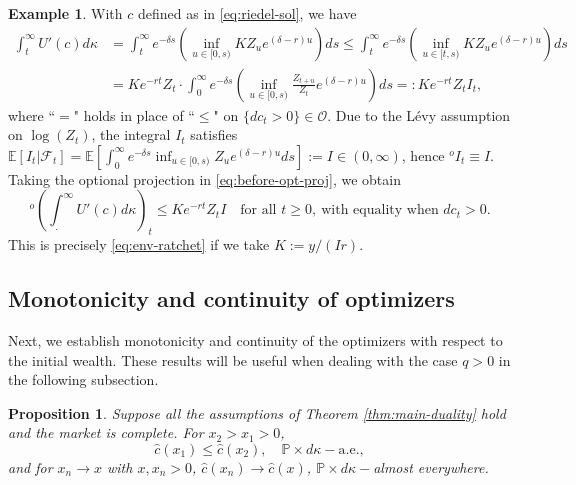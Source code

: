 \documentclass[11pt, oneside]{article}   	%
\theoremstyle{plain}
\newtheorem{prop}[thm]{Proposition}
\theoremstyle{definition}
\newtheorem{exmp}[thm]{Example}
\theoremstyle{remark}
\begin{document}
\begin{exmp}
With $c$ defined as in \eqref{eq:riedel-sol}, we have
\begin{equation}\label{eq:before-opt-proj}
\begin{aligned}
\int_t^\infty U'(c)d\kappa&=\int_t^\infty e^{-\delta s}\left(\inf_{u\in[0,s)} KZ_u e^{(\delta-r)u}\right) ds\leq \int_t^\infty e^{-\delta s}\left(\inf_{u\in[t,s)} KZ_u e^{(\delta-r)u}\right) ds\\
&=Ke^{-rt}Z_t\cdot\int_0^\infty e^{-\delta s} \left(\inf_{u\in[0,s)} \frac{Z_{t+u}}{Z_t} e^{(\delta-r)u}\right) ds=:Ke^{-rt}Z_t I_t,
\end{aligned}
\end{equation}
where ``$=$" holds in place of ``$\leq$" on $\{dc_t>0\}\in\mathcal{O}$. Due to the L\'evy assumption on $\log(Z_t)$, the integral $I_t$ satisfies $\mathbb{E}[I_t\vert\mathcal{F}_t]=\mathbb{E}\left[\int_0^\infty e^{-\delta s}\inf_{u\in[0,s)} Z_u e^{(\delta-r)u} ds\right]:=I\in(0,\infty)$, hence ${}^oI_t\equiv I$. Taking the optional projection in \eqref{eq:before-opt-proj}, we obtain
$$^o\left(\int_.^\infty U'(c)d\kappa\right)_t\leq Ke^{-rt}Z_tI\quad\text{for all }t\geq 0,\ \text{with equality when }dc_t>0.$$
This is precisely \eqref{eq:env-ratchet} if we take $K:=y/(Ir)$.
\end{exmp}


\subsection{Monotonicity and continuity of optimizers}

Next, we establish monotonicity and continuity of the optimizers with respect to the initial wealth. These results will be useful when dealing with the case $q>0$ in the following subsection.
\begin{prop}\label{prop:mon-and-cont}
Suppose all the assumptions of Theorem \ref{thm:main-duality} hold and the market is complete. For $x_2>x_1>0$,
$$\hat{c}(x_1)\leq \hat{c}(x_2),\quad \mathbb{P}\times d\kappa-\text{a.e.},$$
and for $x_n\to x$ with $x,x_n>0$, $\hat{c}(x_n)\to \hat{c}(x)$, $\mathbb{P}\times d\kappa-$almost everywhere.
\end{prop}
\end{document}
